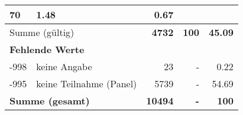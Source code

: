 \begin{longtable}{lXrrr}
       \num{70} &
       \num[round-mode=places,round-precision=2]{1,48} &
         \num[round-mode=places,round-precision=2]{0,67} \\
     \midrule
     \multicolumn{2}{l}{Summe (gültig)} &
       \textbf{\num{4732}} &
     \textbf{100} &
       \textbf{\num[round-mode=places,round-precision=2]{45,09}} \\
     \multicolumn{5}{l}{\textbf{Fehlende Werte}}\\
       -998 &
       keine Angabe &
         \num{23} &
        - &
         \num[round-mode=places,round-precision=2]{0,22} \\
       -995 &
       keine Teilnahme (Panel) &
         \num{5739} &
        - &
         \num[round-mode=places,round-precision=2]{54,69} \\
     \midrule
     \multicolumn{2}{l}{\textbf{Summe (gesamt)}} &
          \textbf{\num{10494}} &
        \textbf{-} &
        \textbf{100} \\
     \bottomrule
     \end{longtable}
     
